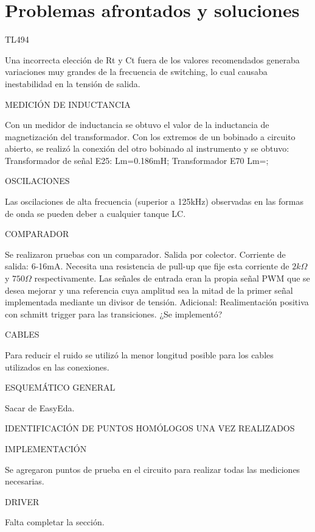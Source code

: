 \section{Problemas afrontados y soluciones}

TL494

Una incorrecta elección de Rt y Ct fuera de los valores recomendados generaba variaciones muy grandes de la frecuencia de switching, 
lo cual causaba inestabilidad en la tensión de salida. 

MEDICIÓN DE INDUCTANCIA 

Con un medidor de inductancia se obtuvo el valor de la inductancia de magnetización del transformador.
Con los extremos de un bobinado a circuito abierto, se realizó la conexión del otro bobinado al instrumento y se obtuvo:
Transformador de señal E25:
Lm=0.186mH; 
Transformador E70
Lm=;    

OSCILACIONES

Las oscilaciones de alta frecuencia (superior a 125kHz) observadas en las formas de onda se pueden deber a cualquier tanque LC. 

COMPARADOR

Se realizaron pruebas con un comparador. 
Salida por colector. Corriente de salida: 6-16mA. Necesita una resistencia de pull-up que fije esta corriente de $2k\Omega$ y $750\Omega$ respectivamente. 
Las señales de entrada eran la propia señal PWM que se desea mejorar y una referencia cuya amplitud 
sea la mitad de la primer señal implementada mediante un divisor de tensión. 
Adicional: Realimentación positiva con schmitt trigger para las transiciones. ¿Se implementó?

CABLES

Para reducir el ruido se utilizó la menor longitud posible para los cables utilizados en las conexiones. 

ESQUEMÁTICO GENERAL 

Sacar de EasyEda. 

IDENTIFICACIÓN DE PUNTOS HOMÓLOGOS UNA VEZ REALIZADOS 

IMPLEMENTACIÓN

Se agregaron puntos de prueba en el circuito para realizar todas las mediciones necesarias. 

DRIVER

Falta completar la sección.  
